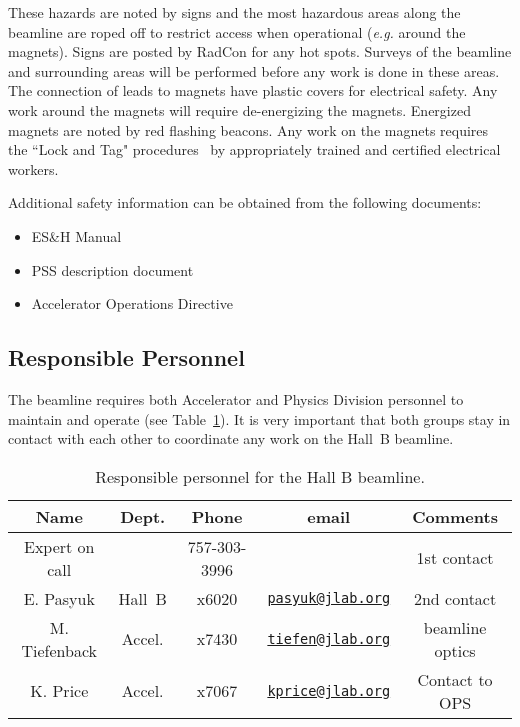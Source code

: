 These hazards are noted by signs and the most hazardous areas along the beamline are 
roped off to restrict access when operational ({\it e.g.} around the magnets). Signs are posted 
by RadCon for any hot spots. Surveys of the beamline and surrounding areas will be 
performed before any work is done in these areas. The connection of leads to magnets have 
plastic covers for electrical safety. Any work around the magnets will require 
de-energizing the magnets. Energized magnets are noted by red flashing beacons. Any work 
on the magnets requires the ``Lock and Tag" procedures~\cite{esh} by appropriately trained
and certified electrical workers.

Additional safety information can be obtained from the following documents:
\begin{itemize}[label=$\circ$]

\item ES\&H Manual~\cite{esh} 

\item PSS description document~\cite{pss}

\item Accelerator Operations Directive~\cite{ops}

\end{itemize} 

\subsection{Responsible Personnel}

The beamline requires both Accelerator and Physics Division personnel to maintain and 
operate (see Table~\ref{tb:beam}). It is very important that both groups stay in contact
with each other to coordinate any work on the Hall~B beamline. 

\begin{table}[!ht]
\centering
\begin{tabular}{|c|c|c|c|c|} \hline
 Name&Dept.&Phone&email&Comments \\ \hline
Expert on call& &757-303-3996&& 1st contact \\ \hline
E. Pasyuk     & Hall~B&x6020&\href{mailto:pasyuk@jlab.org}{\nolinkurl{pasyuk@jlab.org}}&2nd contact \\ \hline
M. Tiefenback & Accel.&x7430&\href{mailto:tiefen@jlab.org}{\nolinkurl{tiefen@jlab.org}}& beamline optics\\ \hline
K. Price      & Accel.&x7067&\href{mailto:kprice@jlab.org}{\nolinkurl{kprice@jlab.org}}&Contact to OPS \\ \hline
\end{tabular}
\caption{Responsible personnel for the Hall B beamline.} 
\label{tb:beam}
\end{table}

